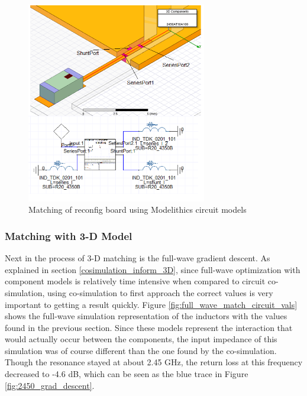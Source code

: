 \documentclass[12pt]{usfcoe}
\begin{document}
    \begin{figure}[H]
		\begin{center}
        	\includegraphics[width=0.7\textwidth]{images/2450_reconfig/mdlx_circuit_cosim.PNG} 
			\caption{Matching of reconfig board using Modelithics circuit models} 
			\label{fig:2450_mdlx_ckt_cosim}
		\end{center}
	\end{figure}    
	
    \subsubsection{Matching with 3-D Model}
    
    Next in the process of 3-D matching is the full-wave gradient descent. 
    As explained in section \ref{cosimulation_inform_3D}, since full-wave optimization with component models is relatively time intensive when compared to circuit co-simulation, using co-simulation to first approach the correct values is very important to getting a result quickly.
    Figure \ref{fig:full_wave_match_circuit_vals} shows the full-wave simulation representation of the inductors with the values found in the previous section.
    Since these models represent the interaction that would actually occur between the components, the input impedance of this simulation was of course different than the one found by the co-simulation. 
    Though the resonance stayed at about 2.45 GHz, the return loss at this frequency decreased to -4.6 dB, which can be seen as the blue trace in Figure \ref{fig:2450_grad_descent}. 
    
\end{document}
